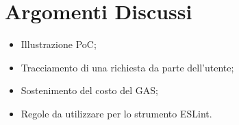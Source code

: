 \section{Argomenti Discussi}
	\begin{itemize}
		\item Illustrazione PoC;
		\item Tracciamento di una richiesta da parte dell'utente;
		\item Sostenimento del costo del GAS;
		\item Regole da utilizzare per lo strumento ESLint.
	\end{itemize}
